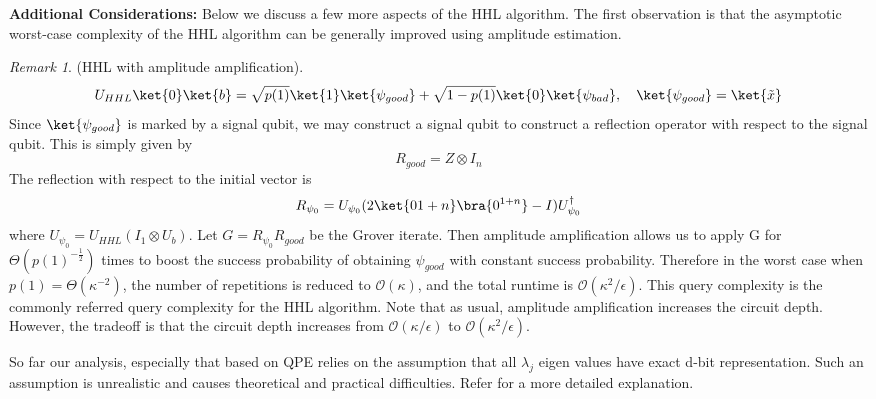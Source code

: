 \documentclass[12pt, oneside]{book}
\theoremstyle{definition}
\theoremstyle{definition}
\theoremstyle{remark}
\newtheorem*{remark}{Remark}
\begin{document}
\textbf{Additional Considerations: }Below we discuss a few more aspects of the HHL algorithm. The first observation is that the asymptotic worst-case complexity of the HHL algorithm can be generally improved using amplitude estimation.

\begin{remark}
    (HHL with amplitude amplification).
    \[
    U_{HHL}\ket{0}\ket{b}=\sqrt{p(1)}\ket{1}\ket{\psi_{good}}+\sqrt{1-p(1)}\ket{0}\ket{\psi_{bad}}, \quad \ket{\psi_{good}} = \ket{\tilde{x}}
    \]
    Since $\ket{\psi_{good}}$ is marked by a signal qubit, we may construct a signal qubit to construct a reflection operator with respect to the signal qubit. This is simply given by
    \[
    R_{good}=Z \otimes I_n
    \]
    The reflection with respect to the initial vector is
    \[
    R_{\psi_0}=U_{\psi_0}(2\ket{0{1+n}}\bra{0^{1+n}}-I)U^{\dagger}_{\psi_0}
    \]
    where $U_{\psi_0}=U_{HHL}(I_1\otimes U_b)$. Let $G=R_{\psi_0}R_{good}$ be the Grover iterate. Then amplitude amplification allows us to apply G for $\Theta(p(1)^{-\frac{1}{2}})$ times to boost the success probability of obtaining $\psi_{good}$ with constant success probability. Therefore in the worst case when $p(1)=\Theta(\kappa^{-2})$, the number of repetitions is reduced to $\mathcal{O}(\kappa)$, and the total runtime is $\mathcal{O}(\kappa^2/\epsilon)$. This query complexity is the commonly referred query complexity for the HHL algorithm. Note that as usual, amplitude amplification increases the circuit depth. However, the tradeoff is that the circuit depth increases from $\mathcal{O}(\kappa/\epsilon)$ to $\mathcal{O}(\kappa^2/\epsilon)$.
\end{remark}
So far our analysis, especially that based on QPE relies on the assumption that all $\lambda_j$ eigen values have exact d-bit representation. Such an assumption is unrealistic and causes theoretical and practical difficulties. Refer \cite{dervovic2018quantumlinearsystemsalgorithms} for a more detailed explanation.
\end{document}

